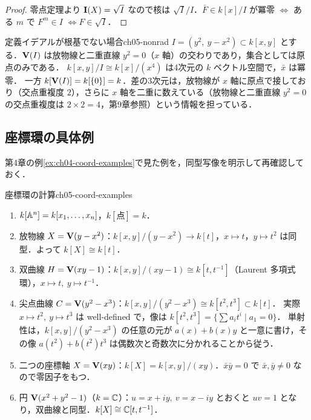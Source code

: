 \begin{proof}
零点定理より $\mathbf{I}(X)=\sqrt I$ なので核は $\sqrt I/I$．$\bar F\in k[x]/I$ が冪零 $\iff$ ある $m$ で $F^m\in I$ $\iff F\in\sqrt I$．
\end{proof}

\begin{myex}{定義イデアルが根基でない場合}{ch05-nonrad}
$I=(y^2,\ y-x^2)\subset k[x,y]$ とする．$\mathbf{V}(I)$ は放物線と二重直線 $y^2=0$（$x$ 軸）の交わりであり，集合としては原点のみである．
$k[x,y]/I\cong k[x]/(x^4)$ は4次元の $k$ ベクトル空間で，$\bar x$ は冪零．
一方 $k[\mathbf{V}(I)]=k[\{0\}]=k$．差の3次元は，放物線が $x$ 軸に原点で接しており（交点重複度 $2$），さらに $x$ 軸を二重に数えている（放物線と二重直線 $y^2=0$ の交点重複度は $2\times2=4$，第9章参照）という情報を担っている．
\end{myex}

\subsection{座標環の具体例}

第4章の例\ref{ex:ch04-coord-examples}で見た例を，同型写像を明示して再確認しておく．

\begin{myex}{座標環の計算}{ch05-coord-examples}
\begin{enumerate}
  \item $k[\mathbb{A}^n]=k[x_1,\dots,x_n]$，$k[\text{点}]=k$．
  \item 放物線 $X=\mathbf{V}(y-x^2)$：$k[x,y]/(y-x^2)\to k[t]$，$x\mapsto t$，$y\mapsto t^2$ は同型．よって $k[X]\cong k[t]$．
  \item 双曲線 $H=\mathbf{V}(xy-1)$：$k[x,y]/(xy-1)\cong k[t,t^{-1}]$（Laurent 多項式環），$x\mapsto t,\ y\mapsto t^{-1}$．
  \item 尖点曲線 $C=\mathbf{V}(y^2-x^3)$：$k[x,y]/(y^2-x^3)\cong k[t^2,t^3]\subset k[t]$．
        実際 $x\mapsto t^2,\ y\mapsto t^3$ は well-defined で，像は $k[t^2,t^3]=\{\sum a_it^i\mid a_1=0\}$．
        単射性は，$k[x,y]/(y^2-x^3)$ の任意の元が $a(x)+b(x)y$ と一意に書け，その像 $a(t^2)+b(t^2)t^3$ は偶数次と奇数次に分かれることから従う．
  \item 二つの座標軸 $X=\mathbf{V}(xy)$：$k[X]=k[x,y]/(xy)$．$\bar x\bar y=0$ で $\bar x,\bar y\neq0$ なので零因子をもつ．
  \item 円 $\mathbf{V}(x^2+y^2-1)$（$k=\mathbb{C}$）：$u=x+iy,\ v=x-iy$ とおくと $uv=1$ となり，双曲線と同型．$k[X]\cong\mathbb{C}[t,t^{-1}]$．
\end{enumerate}
\end{myex}

